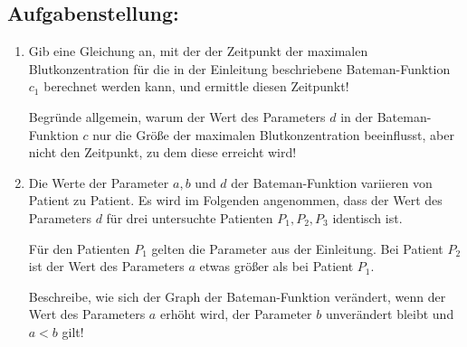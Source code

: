 \begin{langesbeispiel}
\begin{center}
\end{center}

\subsection{Aufgabenstellung:}
\begin{enumerate}
	\item Gib eine Gleichung an, mit der der Zeitpunkt der maximalen Blutkonzentration für die in der Einleitung beschriebene Bateman-Funktion $c_1$ berechnet werden kann, und ermittle diesen Zeitpunkt!\leer
	
	Begründe allgemein, warum der Wert des Parameters $d$ in der Bateman-Funktion $c$ nur die Größe der maximalen Blutkonzentration beeinflusst, aber nicht den Zeitpunkt, zu dem diese erreicht wird!\leer
	
	\item Die Werte der Parameter $a,b$ und $d$ der Bateman-Funktion variieren von Patient zu Patient. Es wird im Folgenden angenommen, dass der Wert des Parameters $d$ für drei untersuchte Patienten $P_1, P_2, P_3$ identisch ist.\leer
	
	Für den Patienten $P_1$ gelten die Parameter aus der Einleitung. Bei Patient $P_2$ ist der Wert des Parameters $a$ etwas größer als bei Patient $P_1$.
	
	Beschreibe, wie sich der Graph der Bateman-Funktion verändert, wenn der Wert des Parameters $a$ erhöht wird, der Parameter $b$ unverändert bleibt und $a<b$ gilt!
	

\end{enumerate}
\end{langesbeispiel}
